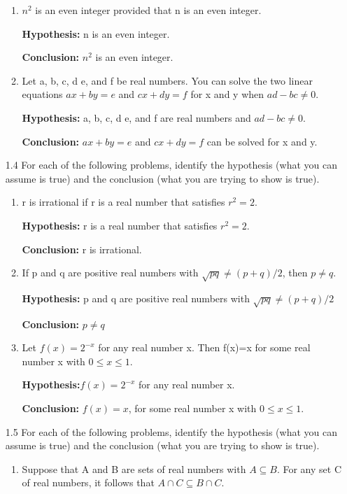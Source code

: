 \documentclass[11pt]{article}
\begin{document}
\begin{enumerate}
\begin{enumerate}
   \item $n^2$ is an even integer provided that n is an even integer.\par 
   \textbf{Hypothesis:} n is an even integer.\par
   \textbf{Conclusion:} $n^2$ is an even integer.
   \item Let a, b, c, d e, and f be real numbers. You can solve the two linear equations $ax+by=e$ and $cx+dy=f$ for x and y when $ad-bc \neq 0$.\par 
   \textbf{Hypothesis:} a, b, c, d e, and f are real numbers and $ad-bc \neq 0$.\par 
   \textbf{Conclusion:} $ax+by=e$ and $cx+dy=f$ can be solved for x and y.
   \end{enumerate}
   \item[1.4] For each of the following problems, identify the hypothesis (what you
can assume is true) and the conclusion (what you are trying to show is true).
   \begin{enumerate}
   \item r is irrational if r is a real number that satisfies $r^2 = 2$.\par 
   \textbf{Hypothesis:} r is a real number that satisfies $r^2 = 2$.\par
   \textbf{Conclusion:} r is irrational.\par 
   \item If p and q are positive real numbers with $\sqrt{pq}\neq (p + q)/2$, then $p \neq q$.\par 
   \textbf{Hypothesis:} p and q are positive real numbers with $\sqrt{pq}\neq (p + q)/2$\par 
   \textbf{Conclusion:} $p \neq q$
   \item Let $f(x)=2^{-x}$ for any real number x. Then f(x)=x for some real number x with $0 \leq x \leq 1$.\par 
   \textbf{Hypothesis:}$f(x)=2^{-x}$ for any real number x.\par 
   \textbf{Conclusion:} $f(x)=x$, for some real number x with $0 \leq x \leq 1$.
   \end{enumerate}
   \item[1.5] For each of the following problems, identify the hypothesis (what you can assume is true) and the conclusion (what you are trying to show is true).
   \begin{enumerate}
    \item Suppose that A and B are sets of real numbers with $A \subseteq B$. For any set C of real numbers, it follows that $A \cap C \subseteq B \cap C$.

\end{enumerate}
\end{enumerate}
\end{document}
